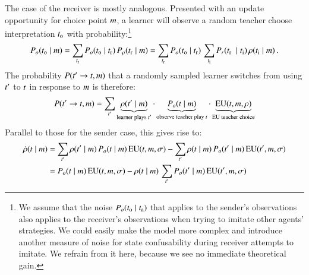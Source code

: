 \documentclass[fleqn,reqno,10pt]{article}
\begin{document}
The case of the receiver is mostly analogous. Presented with an update opportunity for choice
point $m$, a learner will observe a random teacher choose interpretation $t_{\mathrm{o}}$
with probability:\footnote{We assume that the noise $P_o(t_{\mathrm{o}} \mid t_{\mathrm{a}})$
  that applies to the sender's observations also applies to the receiver's observations when
  trying to imitate other agents' strategies. We could easily make the model more complex and
  introduce another measure of noise for state confusability during receiver attempts to
  imitate. We refrain from it here, because we see no immediate theoretical gain.}
\begin{align*}
  P_o(t_{\mathrm{o}} \mid m) = \sum_{t_{\mathrm{r}}} P_o(t_{\mathrm{o}} \mid t_{\mathrm{r}})
  \thinspace P_{\rho}(t_{\mathrm{r}} \mid m) = \sum_{t_{\mathrm{r}}} P_o(t_{\mathrm{o}} \mid t_{\mathrm{r}})
  \thinspace \sum_{t_{\mathrm{i}}} P_r(t_{\mathrm{r}} \ \mid
  t_{\mathrm{i}}) \thinspace \rho(t_{\mathrm{i}} \mid m) \,.
\end{align*}
The probability $P(t' \rightarrow t, m)$ that a randomly sampled learner switches
from using $t'$ to $t$ in response to $m$ is therefore:
\begin{align*}
  P(t' \rightarrow t, m) = \sum_{t'} \underbrace{\rho(t' \mid
    m)}_{\text{learner plays $t'$}} \cdot
  \underbrace{P_{o}(t \mid m)}_{\text{observe teacher play $t$}} \cdot
  \underbrace{\mathrm{EU}(t, m, \rho)}_{\text{EU teacher choice}}
\end{align*}
Parallel to those for the sender case, this gives rise to:
\begin{align}
  \label{eq:nRDReceiver}
  \dot{\rho}(t \mid m) & = \sum_{t'} \rho(t' \mid m)
  \thinspace P_o(t \mid m) \thinspace \mathrm{EU}(t, m, \sigma) - \sum_{t'}
  \rho(t \mid m) \thinspace
  P_o(t' \mid m) \thinspace \mathrm{EU}(t', m, \sigma) \nonumber \\
  & = P_o(t \mid m) \thinspace \mathrm{EU}(t, m, \sigma) - \rho(t \mid
  m) \thinspace \sum_{t'}
  P_o(t' \mid m) \thinspace \mathrm{EU}(t', m, \sigma) 
\end{align}
\end{document}
